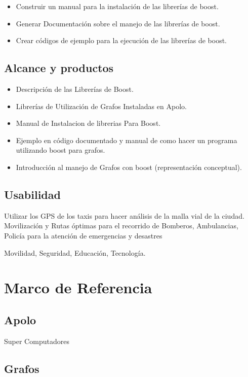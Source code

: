 \documentclass[twoside,letterpaper,12pt]{report}
\begin{document}
\begin{itemize}
	\item Construir un manual para la instalación de las librerías de boost.
	\item Generar Documentación sobre el manejo de las librerías de boost.
	\item Crear códigos de ejemplo para la ejecución de las librerías de boost.
\end{itemize}



\section{Alcance y productos}

\begin{itemize}
	\item Descripción de las Librerías de Boost.
	\item Librerías de Utilización de Grafos Instaladas en Apolo.
	\item Manual de Instalacion de librerias Para Boost.
	\item Ejemplo en código documentado y manual de como hacer un programa utilizando boost para grafos.
	\item Introducción al manejo de Grafos con boost (representación conceptual).

\end{itemize}


\section{Usabilidad}

Utilizar los GPS de los taxis para hacer análisis de la malla vial de la ciudad. 
Movilización y Rutas óptimas para el recorrido de Bomberos, Ambulancias, Policía para la atención de emergencias y desastres

Movilidad, Seguridad, Educación, Tecnología.

\chapter{Marco de Referencia}
\label{ChapRef}

\section{Apolo} Super Computadores
\section{Grafos}
\end{document}
